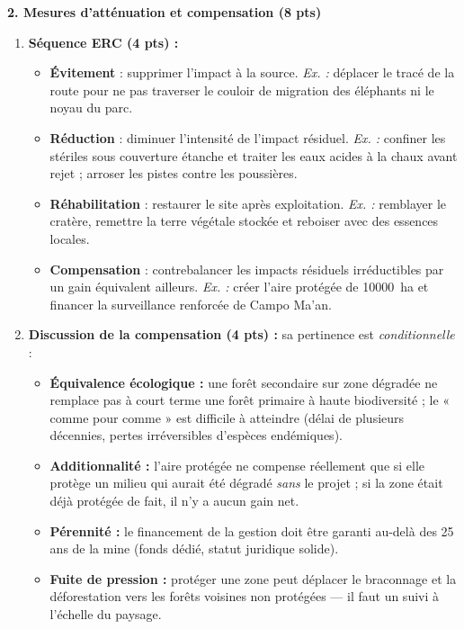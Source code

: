 \documentclass[11pt]{article}
\begin{document}
\begin{corrige}
\textbf{2. Mesures d'atténuation et compensation (8 pts)}
\begin{enumerate}
\item \textbf{Séquence ERC (4 pts) :}
\begin{itemize}
\item \textbf{Évitement} : supprimer l'impact à la source. \emph{Ex. :} déplacer le tracé de la route pour ne pas traverser le couloir de migration des éléphants ni le noyau du parc.
\item \textbf{Réduction} : diminuer l'intensité de l'impact résiduel. \emph{Ex. :} confiner les stériles sous couverture étanche et traiter les eaux acides à la chaux avant rejet ; arroser les pistes contre les poussières.
\item \textbf{Réhabilitation} : restaurer le site après exploitation. \emph{Ex. :} remblayer le cratère, remettre la terre végétale stockée et reboiser avec des essences locales.
\item \textbf{Compensation} : contrebalancer les impacts résiduels irréductibles par un gain équivalent ailleurs. \emph{Ex. :} créer l'aire protégée de \SI{10 000}{ha} et financer la surveillance renforcée de Campo Ma'an.
\end{itemize}
\item \textbf{Discussion de la compensation (4 pts) :} sa pertinence est \emph{conditionnelle} :
\begin{itemize}
\item \textbf{Équivalence écologique :} une forêt secondaire sur zone dégradée ne remplace pas à court terme une forêt primaire à haute biodiversité ; le « comme pour comme » est difficile à atteindre (délai de plusieurs décennies, pertes irréversibles d'espèces endémiques).
\item \textbf{Additionnalité :} l'aire protégée ne compense réellement que si elle protège un milieu qui aurait été dégradé \emph{sans} le projet ; si la zone était déjà protégée de fait, il n'y a aucun gain net.
\item \textbf{Pérennité :} le financement de la gestion doit être garanti au-delà des 25 ans de la mine (fonds dédié, statut juridique solide).
\item \textbf{Fuite de pression :} protéger une zone peut déplacer le braconnage et la déforestation vers les forêts voisines non protégées — il faut un suivi à l'échelle du paysage.
\end{itemize}
\end{enumerate}


\end{corrige}
\end{document}
